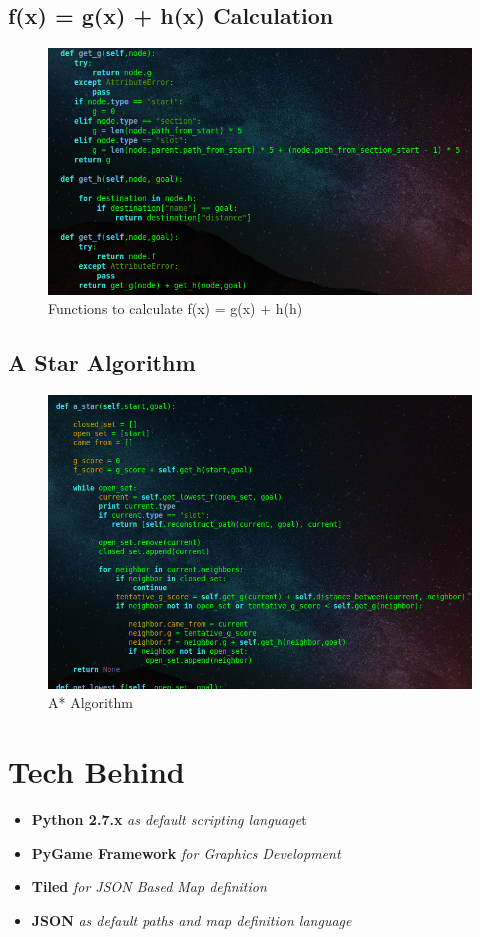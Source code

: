 \subsection{f(x) = g(x) + h(x) Calculation}
\begin{figure}[H]
    \centering
    \includegraphics[width=.9\textwidth]{images/f_g_h.png}
    \caption{Functions to calculate f(x) = g(x) + h(h)}
    \label{fig:f_g_h}
\end{figure}

\subsection{A Star Algorithm}
\begin{figure}[H]
    \centering
    \includegraphics[width=.9\textwidth]{images/a_star.png}
    \caption{A* Algorithm}
    \label{fig:a_star}
\end{figure}

\section{Tech Behind}

\begin{itemize}
  \item \textbf{Python 2.7.x} \textit{as default scripting language}t
  \item \textbf{PyGame Framework} \textit{for Graphics Development}
  \item \textbf{Tiled} \textit{for JSON Based Map definition}
  \item \textbf{JSON} \textit{as default paths and map definition language}
\end{itemize}

